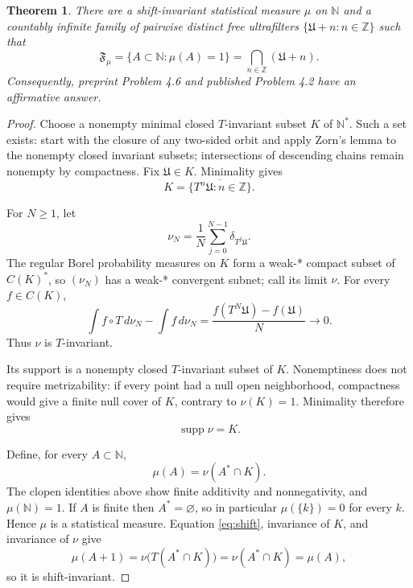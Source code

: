 \documentclass[11pt]{article}
\newtheorem{theorem}{Theorem}
\newcommand{\N}{\mathbb N}
\newcommand{\F}{\mathfrak F}
\newcommand{\U}{\mathfrak U}
\begin{document}
\begin{theorem}\label{thm:main}
There are a shift-invariant statistical measure $\mu$ on $\N$ and a
countably infinite family of pairwise distinct free ultrafilters
$\{\U+n:n\in\mathbb Z\}$ such that
\[
 \F_\mu=\{A\subset\N:\mu(A)=1\}
       =\bigcap_{n\in\mathbb Z}(\U+n).
\]
Consequently, preprint Problem 4.6 and published Problem 4.2 have an
affirmative answer.
\end{theorem}

\begin{proof}
Choose a nonempty minimal closed $T$-invariant subset $K$ of $\N^*$.
Such a set exists: start with the closure of any two-sided orbit and apply
Zorn's lemma to the nonempty closed invariant subsets; intersections of
descending chains remain nonempty by compactness.  Fix $\U\in K$.
Minimality gives
\begin{equation}
 K=\overline{\{T^n\U:n\in\mathbb Z\}}.
 \label{eq:denseorbit}
\end{equation}

For $N\geq1$, let
\[
 \nu_N=\frac1N\sum_{j=0}^{N-1}\delta_{T^j\U}.
\]
The regular Borel probability measures on $K$ form a weak-* compact subset
of $C(K)^*$, so $(\nu_N)$ has a weak-* convergent subnet; call its limit
$\nu$.  For every $f\in C(K)$,
\[
 \int f\!\circ T\,d\nu_N-\int f\,d\nu_N
 =\frac{f(T^N\U)-f(\U)}{N}\longrightarrow0.
\]
Thus $\nu$ is $T$-invariant.

Its support is a nonempty closed $T$-invariant subset of $K$.  Nonemptiness
does not require metrizability: if every point had a null open
neighborhood, compactness would give a finite null cover of $K$, contrary
to $\nu(K)=1$.  Minimality therefore gives
\begin{equation}
 \operatorname{supp}\nu=K.
 \label{eq:fullsupport}
\end{equation}

Define, for every $A\subset\N$,
\begin{equation}
 \mu(A)=\nu(A^*\cap K).
 \label{eq:mu}
\end{equation}
The clopen identities above show finite additivity and nonnegativity, and
$\mu(\N)=1$.  If $A$ is finite then $A^*=\varnothing$, so in particular
$\mu(\{k\})=0$ for every $k$.  Hence $\mu$ is a statistical measure.
Equation \eqref{eq:shift}, invariance of $K$, and invariance of $\nu$ give
\[
 \mu(A+1)=\nu\bigl(T(A^*\cap K)\bigr)=\nu(A^*\cap K)=\mu(A),
\]
so it is shift-invariant.


\end{proof}
\end{document}

